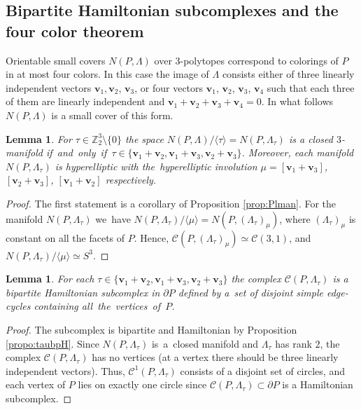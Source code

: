 \documentclass[12pt]{amsart}
\newtheorem{lemma}[formula]{Lemma}
\theoremstyle{definition}
\theoremstyle{remark}
\begin{document}
\subsection{Bipartite Hamiltonian subcomplexes and the four color theorem}\label{ssec:4c}
Orientable small covers $N(P,\Lambda)$ over $3$-polytopes correspond to colorings of $P$ in at most four colors. 
In this case the image of $\Lambda$ consists either of three linearly independent vectors 
$\boldsymbol{v}_1, \boldsymbol{v}_2$, $\boldsymbol{v}_3$, or four vectors
$\boldsymbol{v}_1$, $\boldsymbol{v}_2$, $\boldsymbol{v}_3$, $\boldsymbol{v}_4$ such that each three of them are linearly independent and $\boldsymbol{v}_1+\boldsymbol{v}_2+\boldsymbol{v}_3+\boldsymbol{v}_4=0$.
In what follows $N(P,\Lambda)$ is a small cover of this form.
\begin{lemma}
For $\tau\in \mathbb Z_2^3\setminus\{0\}$ the space $N(P,\Lambda)/\langle\tau\rangle=N(P,\Lambda_\tau)$
is a closed $3$-manifold if~and~only~if~$\tau\in\{\boldsymbol{v}_1+\boldsymbol{v}_2,\boldsymbol{v}_1+\boldsymbol{v}_3,
\boldsymbol{v}_2+\boldsymbol{v}_3\}$. Moreover, each manifold $N(P,\Lambda_\tau)$ is hyperelliptic 
with the~hyperelliptic involution $\mu=[\boldsymbol{v}_1+\boldsymbol{v}_3]$, $[\boldsymbol{v}_2+\boldsymbol{v}_3]$, 
$[\boldsymbol{v}_1+\boldsymbol{v}_2]$ respectively.
\end{lemma}
\begin{proof}
The first statement is a corollary of Proposition \ref{prop:Plman}. For the manifold $N(P,\Lambda_\tau)$
we~have $N(P,\Lambda_\tau)/\langle\mu\rangle=N(P,(\Lambda_\tau)_\mu)$, where $(\Lambda_\tau)_\mu$ is constant
on all the facets of $P$. Hence, $\mathcal{C}(P,(\Lambda_\tau)_\mu)\simeq \mathcal{C}(3,1)$, and $N(P,\Lambda_\tau)/\langle\mu\rangle\simeq S^3$.
\end{proof}
\begin{lemma}
For each $\tau\in\{\boldsymbol{v}_1+\boldsymbol{v}_2,\boldsymbol{v}_1+\boldsymbol{v}_3,
\boldsymbol{v}_2+\boldsymbol{v}_3\}$ the complex $\mathcal{C}(P,\Lambda_\tau)$ is a bipartite Hamiltonian
subcomplex in $\partial P$ defined by a~set of disjoint simple edge-cycles containing all~the~vertices~of~$P$.
\end{lemma}
\begin{proof}
The subcomplex is bipartite and Hamiltonian by Proposition \ref{propo:taubpH}. Since  $N(P,\Lambda_\tau)$ is~a~closed manifold
and $\Lambda_\tau$ has rank $2$, the complex $\mathcal{C}(P,\Lambda_\tau)$  has no vertices (at a vertex there should 
be three linearly independent vectors). Thus, $\mathcal{C}^1(P,\Lambda_\tau)$ consists of a disjoint set of 
circles, and each vertex of $P$ lies on exactly one circle since $\mathcal{C}(P,\Lambda_\tau)\subset \partial P$ is a 
Hamiltonian subcomplex.
\end{proof}
\end{document}
